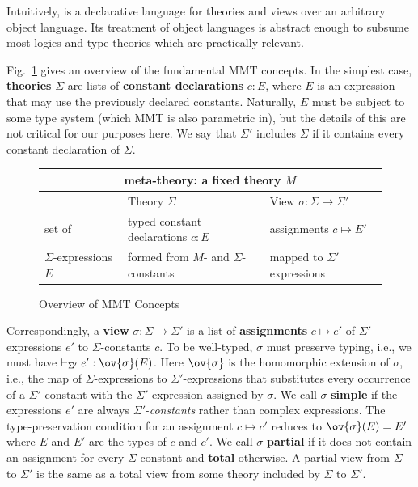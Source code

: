 Intuitively, \mmt is a declarative language for theories and views over an arbitrary object language.
Its treatment of object languages is abstract enough to subsume most logics and type theories which are practically relevant.

Fig.~\ref{fig:mmt} gives an overview of the fundamental MMT concepts.
In the simplest case, \textbf{theories} $\Sigma$ are lists of \textbf{constant declarations} $c:E$, where $E$ is an expression that may use the previously declared constants.
Naturally, $E$ must be subject to some type system (which MMT is also parametric in), but the details of this are not critical for our purposes here.
We say that $\Sigma'$ includes $\Sigma$ if it contains every constant declaration of $\Sigma$.

\begin{figure}[htb]\centering
\begin{tabular}{|l|l|l|}\hline
\multicolumn{3}{|c|}{meta-theory: a fixed theory $M$}\\\hline
       & Theory $\Sigma$    & View $\sigma:\Sigma\to\Sigma'$ \\\hline
set of & typed constant declarations $c:E$ & assignments $c\mapsto E'$ \\
$\Sigma$-expressions $E$ & formed from $M$- and $\Sigma$-constants  & mapped to $\Sigma'$ expressions \\\hline
\end{tabular}
\caption{Overview of MMT Concepts}\label{fig:mmt}
\end{figure}

Correspondingly, a \textbf{view} $\sigma:\Sigma\to\Sigma'$ is a list of \textbf{assignments} $c\mapsto e'$ of $\Sigma'$-expressions $e'$ to $\Sigma$-constants $c$.
To be well-typed, $\sigma$ must preserve typing, i.e., we must have $\vdash_{\Sigma'}e':\ov{\sigma}(E)$.
Here $\ov{\sigma}$ is the homomorphic extension of $\sigma$, i.e., the map of $\Sigma$-expressions to $\Sigma'$-expressions that substitutes every occurrence of a $\Sigma'$-constant with the $\Sigma'$-expression assigned by $\sigma$.
We call $\sigma$ \textbf{simple} if the expressions $e'$ are always $\Sigma'$-\emph{constants} rather than complex expressions.
The type-preservation condition for an assignment $c\mapsto c'$ reduces to $\ov{\sigma}(E)=E'$ where $E$ and $E'$ are the types of $c$ and $c'$.
We call $\sigma$ \textbf{partial} if it does not contain an assignment for every $\Sigma$-constant and \textbf{total} otherwise.
A partial view from $\Sigma$ to $\Sigma'$ is the same as a total view from some theory included by $\Sigma$ to $\Sigma'$.


